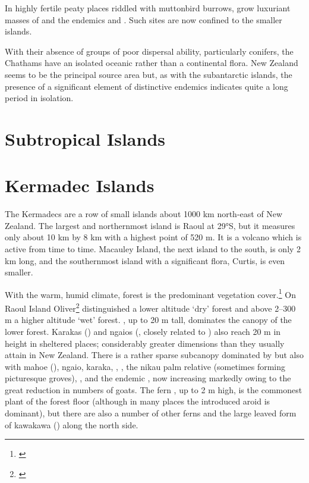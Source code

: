 In highly fertile peaty places riddled with muttonbird burrows, grow luxuriant masses of  and the endemics  and .
Such sites are now confined to the smaller islands.

With their absence of groups of poor dispersal ability, particularly conifers, the Chathams have an isolated oceanic rather than a continental flora.
New Zealand seems to be the principal source area but, as with the subantarctic islands, the presence of a significant element of distinctive endemics indicates quite a long period in isolation.

\section{Subtropical Islands}

\section{Kermadec Islands}

The Kermadecs are a row of small islands about 1000 km north-east of New Zealand.
The largest and northernmost island is Raoul at 29°S, but it measures only about 10 km by 8 km with a highest point of 520 m.
It is a volcano which is active from time to time.
Macauley Island, the next island to the south, is only 2 km long, and the southernmost island with a significant flora, Curtis, is even smaller.

With the warm, humid climate, forest is the predominant vegetation cover.\footnote{\cite{sykes1977annotated}}
On Raoul Island Oliver\footnote{\cite{oliver1910vegetation}} distinguished a lower altitude `dry' forest and above 2–300 m a higher altitude `wet' forest. , up to 20 m tall, dominates the canopy of the lower forest.
Karakas () and ngaios (, closely related to ) also reach 20 m in height in sheltered places; considerably greater dimensions than they usually attain in New Zealand.
There is a rather sparse subcanopy dominated by  but also with mahoe (), ngaio, karaka, , , the nikau palm relative  (sometimes forming picturesque groves), , and the endemic , now increasing markedly owing to the great reduction in numbers of goats.
The fern , up to 2 m high, is the commonest plant of the forest floor (although in many places the introduced aroid  is dominant), but there are also a number of other ferns and the large leaved form of kawakawa () along the north side.

